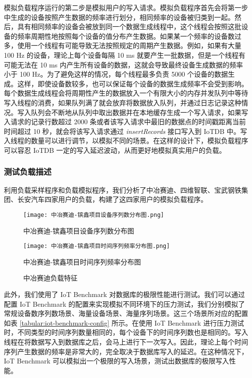 模拟负载程序运行的第二步是模拟用户的写入请求。模拟负载程序首先会将第一步中生成的设备按照产生数据的频率进行划分，相同频率的设备被归类到一起。然后，具有相同频率的设备会被放到同一个数据生成线程中，这个线程会按照这批设备的频率周期性地按照每个设备的值分布产生数据。如果某一个频率的设备数过多，使用一个线程有可能导致无法按照规定的周期产生数据。例如，如果有大量 100 Hz 的设备，理论上每个设备每隔 10 ms 就要产生一批数据，但是一个线程有可能无法在 10 ms 内产生所有设备的数据，这就会导致最终设备生成数据的频率小于 100 Hz。为了避免这样的情况，每个线程最多负责 5000 个设备的数据生成。这样，即使设备数较多，也可以保证每个设备的数据生成频率不会受到影响。每个数据生成线程会将周期性产生的数据放入一个有限大小的内存并发队列中等待写入线程的消费，如果队列满了就会放弃将数据放入队列，并通过日志记录这种情况。写入队列会不断地从队列中取出数据并在本地缓存生成一个写入请求，如果写入请求的记录行数超过 2000 条或者该写入请求中最旧的数据点的时间戳距离当前时间超过 10 秒，就会将该写入请求通过 \emph{insertRecords} 接口写入到 IoTDB 中。写入线程的数量可以进行调节，以模拟不同的场景。在这样的设计下，模拟负载程序可以容忍 IoTDB 一定的写入延迟波动，从而更好地模拟真实用户的负载。
\subsubsection{测试负载描述}
利用负载采样程序和负载模拟程序，我们分析了中冶赛迪、四维智联、宝武钢铁集团、长安汽车四家用户的负载，构建了这四家用户的模拟负载程序。

\begin{figure}[htbp]
  \centering
  \begin{minipage}[t]{0.48\textwidth}
  \centering
  \texttt{[image: 中冶赛迪-镔鑫项目设备序列数分布图.png]}
  \caption{中冶赛迪-镔鑫项目设备序列数分布图}
  \end{minipage}
  \begin{minipage}[t]{0.48\textwidth}
  \centering
  \texttt{[image: 中冶赛迪-镔鑫项目时间序列频率分布图.png]}
  \caption{中冶赛迪-镔鑫项目时间序列频率分布图}
  \end{minipage}
  \label{fig:zysd-bx-load-feature}
  \caption{中冶赛迪负载特征}
\end{figure}

此外，我们使用了 IoT Benchmark 对数据库的极限性能进行测试。我们可以通过配置 IoT Benchmark 的配置来实现模拟不同环境下的压力测试，我们分别模拟了常规设备数序列数场景、海量设备场景、海量序列场景。这三个场景所对应的配置如表 \ref{tabular:iot-benchmark-config} 所示。在使用 IoT Benchmark 进行压力测试时，不同类型的时间序列数量相同的，每个设备下的时间序列数也是相同的。写入线程在将数据写入到数据库之后，会马上进行下一次写入。因此，理论上每个时间序列产生数据的频率是非常大的，完全取决于数据库写入的延迟。在这种情况下，IoT Benchmark 可以模拟出一个极限的写入场景，测试出数据库的极限写入性能。

